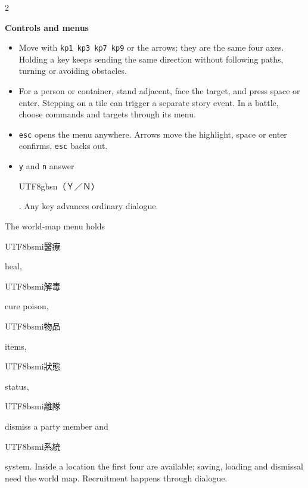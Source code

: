 \begin{paracol}{2}
\switchcolumn*
\footnotesize\setlength{\parskip}{2pt}
{\footnotesize\bfseries Controls and menus\par}
\begin{itemize}[leftmargin=*,topsep=1pt,itemsep=0pt,parsep=0pt]\item Move with \texttt{kp1 kp3 kp7 kp9} or the arrows; they are the same four axes. Holding a key keeps sending the same direction without following paths, turning or avoiding obstacles.\item For a person or container, stand adjacent, face the target, and press space or enter. Stepping on a tile can trigger a separate story event. In a battle, choose commands and targets through its menu.\item \texttt{esc} opens the menu anywhere. Arrows move the highlight, space or enter confirms, \texttt{esc} backs out.\item \texttt{y} and \texttt{n} answer \begin{CJK}{UTF8}{gbsn}（Ｙ／Ｎ）\end{CJK}. Any key advances ordinary dialogue.\end{itemize}
The world-map menu holds \begin{CJK}{UTF8}{bsmi}醫療\end{CJK} heal, \begin{CJK}{UTF8}{bsmi}解毒\end{CJK} cure poison, \begin{CJK}{UTF8}{bsmi}物品\end{CJK} items, \begin{CJK}{UTF8}{bsmi}狀態\end{CJK} status, \begin{CJK}{UTF8}{bsmi}離隊\end{CJK} dismiss a party member and \begin{CJK}{UTF8}{bsmi}系統\end{CJK} system. Inside a location the first four are available; saving, loading and dismissal need the world map. Recruitment happens through dialogue.\par

\end{paracol}
